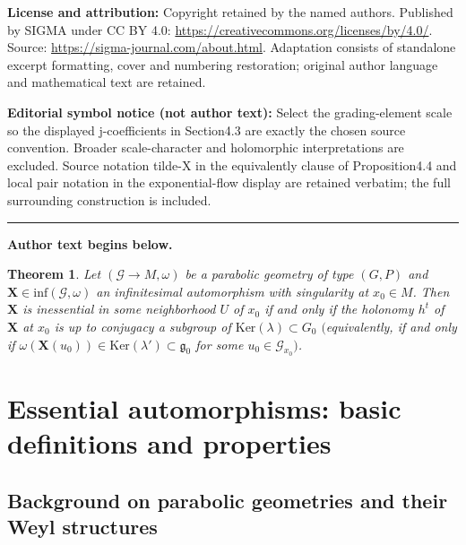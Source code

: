 \documentclass[11pt]{article}
\def\g{\mathfrak{g}}
\def\Gbdle{\mathcal{G}}
\theoremstyle{plain}
\newtheorem{Theorem}{Theorem}[section]
\theoremstyle{definition}
\begin{document}
\noindent\textbf{License and attribution:} Copyright retained by the named authors. Published by SIGMA under CC BY 4.0: \url{https://creativecommons.org/licenses/by/4.0/}. Source: \url{https://sigma-journal.com/about.html}. Adaptation consists of standalone excerpt formatting, cover and numbering restoration; original author language and mathematical text are retained.\par
\noindent\textbf{Editorial symbol notice (not author text):} Select the grading-element scale so the displayed j-coefficients in Section4.3 are exactly the chosen source convention. Broader scale-character and holomorphic interpretations are excluded. Source notation tilde-X in the equivalently clause of Proposition4.4 and local pair notation in the exponential-flow display are retained verbatim; the full surrounding construction is included.\par
\medskip\hrule\medskip\noindent\textbf{Author text begins below.}\par
\setcounter{section}{1}
\setcounter{subsection}{2}
\setcounter{subsubsection}{0}
\setcounter{Theorem}{1}
\setcounter{equation}{0}
\begin{Theorem} \label{local essential dictionary} Let $(\Gbdle \rightarrow M,\omega)$ be a parabolic geometry of type $(G,P)$ and $\mathbf{X} \in \mathrm{inf}(\Gbdle,\omega)$ an infinitesimal automorphism with singularity at $x_0 \in M$. Then $\mathbf{X}$ is inessential in some neighborhood $U$ of $x_0$ if and only if the holonomy $h^t$ of $\mathbf{X}$ at $x_0$ is up to conjugacy a subgroup of $\mathrm{Ker}(\lambda) \subset G_0$ $($equivalently, if and only if $\omega(\mathbf{X}(u_0)) \in \mathrm{Ker}(\lambda') \subset \g_0$ for some $u_0 \in \Gbdle_{x_0})$.
\end{Theorem}
\setcounter{section}{1}
\setcounter{subsection}{2}
\setcounter{subsubsection}{0}
\setcounter{Theorem}{2}
\setcounter{equation}{0}
\section{Essential automorphisms: basic def\/initions and properties}\label{section2}

\subsection{Background on parabolic geometries and their Weyl structures}\label{section2.1}
\end{document}
